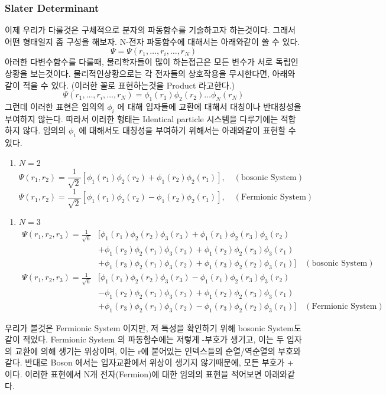 \documentclass[11pt]{article}
\begin{document}
\subsubsection{Slater Determinant}
이제 우리가 다룰것은 구체적으로 분자의 파동함수를 기술하고자 하는것이다. 그래서 어떤 형태일지 좀 구성을 해보자.
N-전자 파동함수에 대해서는 아래와같이 쓸 수 있다. 
\[
\Psi = \Psi(r_1, \dots, r_i, \dots, r_N)
\]
아러한 다변수함수를 다룰때, 물리학자들이 많이 하는접근은 모든 변수가 서로 독립인 상황을 보는것이다. 
물리적인상황으로는 각 전자들의 상호작용을 무시한다면, 아래와같이 적을 수 있다. (이러한 꼴로 표현하는것을  Product 라고한다.)
\[
\Psi(r_1, \dots, r_i, \dots, r_N)=\phi_1(r_1)\phi_2(r_2)\dots\phi_N(r_N)
\]
그런데 이러한 표현은 임의의 \(\phi_i\) 에 대해 입자들에 교환에 대해서 대칭이나 반대칭성을 부여하지 않는다. 
따라서 이러한 형태는 Identical particle 시스템을 다루기에는 적합하지 않다. 
임의의 \(\phi_i\) 에 대해서도 대칭성을 부여하기 위해서는 아래와같이 표현할 수 있다.
\begin{enumerate}[label=\(\mathrm{i}\))]
\item {\(N=2\)}
\[
\Psi(r_1,r_2)=\frac{1}{\sqrt{2}}[\phi_1(r_1)\phi_2(r_2)+\phi_1(r_2)\phi_2(r_1)],\quad (\text{bosonic System})
\]
\[
\Psi(r_1,r_2)=\frac{1}{\sqrt{2}}[\phi_1(r_1)\phi_2(r_2)-\phi_1(r_2)\phi_2(r_1)],\quad (\text{Fermionic System})
\]
\end{enumerate}
\begin{enumerate}[label=\(\mathrm{ii}\))]
\item {\(N=3\)}
\begin{align*}
\Psi(r_1,r_2,r_3)=\frac{1}{\sqrt{6}}&[\phi_1(r_1)\phi_2(r_2)\phi_3(r_3)+\phi_1(r_1)\phi_2(r_3)\phi_3(r_2) \\
&+\phi_1(r_2)\phi_2(r_1)\phi_3(r_3)+\phi_1(r_2)\phi_2(r_3)\phi_3(r_1)\\
&+\phi_1(r_3)\phi_2(r_1)\phi_3(r_2)+\phi_1(r_3)\phi_2(r_2)\phi_3(r_1)]\quad (\text{bosonic System})
\end{align*}
\begin{align*}
\Psi(r_1,r_2,r_3)=\frac{1}{\sqrt{6}}&[\phi_1(r_1)\phi_2(r_2)\phi_3(r_3)-\phi_1(r_1)\phi_2(r_3)\phi_3(r_2) \\
&-\phi_1(r_2)\phi_2(r_1)\phi_3(r_3)+\phi_1(r_2)\phi_2(r_3)\phi_3(r_1)\\
&+\phi_1(r_3)\phi_2(r_1)\phi_3(r_2)-\phi_1(r_3)\phi_2(r_2)\phi_3(r_1)]\quad (\text{Fermionic System})
\end{align*}
\end{enumerate}
우리가 볼것은 Fermionic System 이지만, 저 특성을 확인하기 위해 bosonic System도 같이 적었다. 
Fermionic System 의 파동함수에는 저렇게 -부호가 생기고, 이는 두 입자의 교환에 의해 생기는 위상이며, 이는 r에 붙어있는 인덱스들의 순열/역순열의 부호와 같다. 
반대로 Boson 에서는 입자교환에서 위상이 생기지 않기때문에, 모든 부호가 + 이다.
이러한 표현에서 N개 전자(Fermion)에 대한 임의의 표현을 적어보면 아래와같다. 
\end{document}
